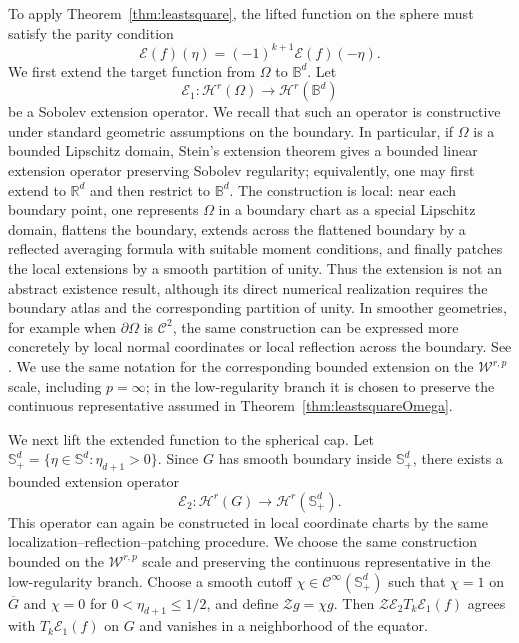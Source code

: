 \documentclass{article}
\numberwithin{equation}{section}
\def\RR{\mathbb{R}}
\def\BB{\mathbb{B}}
\def\SS{\mathbb{S}}
\begin{document}
To apply Theorem~\ref{thm:leastsquare}, the lifted function on the sphere must satisfy the parity condition
\[
\mathcal{E}(f)(\eta)=(-1)^{k+1}\mathcal{E}(f)(-\eta).
\]
We first extend the target function from $\Omega$ to $\BB^d$. Let
\[
\mathcal E_1:\mathcal H^r(\Omega)\to\mathcal H^r(\BB^d)
\]
be a Sobolev extension operator. We recall that such an operator is constructive under standard geometric assumptions on the boundary. In particular, if $\Omega$ is a bounded Lipschitz domain, Stein's extension theorem gives a bounded linear extension operator preserving Sobolev regularity; equivalently, one may first extend to $\RR^d$ and then restrict to $\BB^d$. The construction is local: near each boundary point, one represents $\Omega$ in a boundary chart as a special Lipschitz domain, flattens the boundary, extends across the flattened boundary by a reflected averaging formula with suitable moment conditions, and finally patches the local extensions by a smooth partition of unity. Thus the extension is not an abstract existence result, although its direct numerical realization requires the boundary atlas and the corresponding partition of unity. In smoother geometries, for example when $\partial\Omega$ is $\mathcal{C}^2$, the same construction can be expressed more concretely by local normal coordinates or local reflection across the boundary. See \cite{stein1970singular,adams2003sobolev,burenkov1998sobolev}. We use the same notation for the corresponding bounded extension on the $\mathcal W^{r,p}$ scale, including $p=\infty$; in the low-regularity branch it is chosen to preserve the continuous representative assumed in Theorem~\ref{thm:leastsquareOmega}.

We next lift the extended function to the spherical cap. Let $\SS^d_+=\{\eta\in\SS^d:\eta_{d+1}>0\}$. Since $G$ has smooth boundary inside $\SS^d_+$, there exists a bounded extension operator
\[
\mathcal E_2:\mathcal H^r(G)\to\mathcal H^r(\SS^d_+).
\]
This operator can again be constructed in local coordinate charts by the same localization--reflection--patching procedure. We choose the same construction bounded on the $\mathcal W^{r,p}$ scale and preserving the continuous representative in the low-regularity branch. Choose a smooth cutoff $\chi\in \mathcal{C}^\infty(\SS^d_+)$ such that $\chi=1$ on $\overline G$ and $\chi=0$ for $0<\eta_{d+1}\le1/2$, and define $\mathcal Zg=\chi g$. Then $\mathcal Z\mathcal E_2T_k\mathcal E_1(f)$ agrees with $T_k\mathcal E_1(f)$ on $G$ and vanishes in a neighborhood of the equator.
\end{document}
